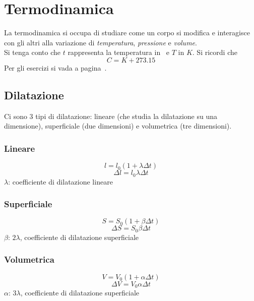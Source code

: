 
\section{Termodinamica}\label{sec:termodinamica}
La termodinamica si occupa di studiare come un corpo si modifica e interagisce con gli altri
alla variazione di \emph{temperatura}, \emph{pressione} e \emph{volume}.\\
Si tenga conto che $t$ rappresenta la temperatura in \textcelsius\ e $T$ in $K$. Si ricordi che
\begin{equation*}
C = K + 273.15
\end{equation*}
Per gli esercizi si vada a pagina~\pageref{ex:termodinamica}.

\subsection{Dilatazione}
Ci sono 3 tipi di dilatazione: lineare (che studia la dilatazione su una dimensione), superficiale 
(due dimensioni) e volumetrica (tre dimensioni).

\subsubsection{Lineare}
\begin{equation*}
l = l_0\left(1+\lambda\Delta t\right)
\end{equation*}
\begin{equation*}
\Delta l = l_0\lambda\Delta t
\end{equation*}
$\lambda$: coefficiente di dilatazione lineare

\subsubsection{Superficiale}
\begin{equation*}
S = S_0\left(1+\beta\Delta t\right)
\end{equation*}
\begin{equation*}
\Delta S = S_0\beta\Delta t
\end{equation*}
$\beta$: $2\lambda$, coefficiente di dilatazione superficiale

\subsubsection{Volumetrica}
\begin{equation*}
V = V_0\left(1+\alpha\Delta t\right)
\end{equation*}
\begin{equation*}
\Delta V = V_0\alpha\Delta t
\end{equation*}
$\alpha$: $3\lambda$, coefficiente di dilatazione superficiale\\

